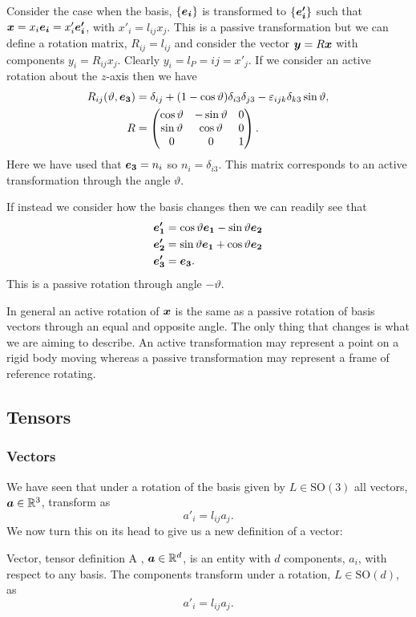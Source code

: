 \documentclass[a4paper]{article}
\newcommand{\specialOrthogonalGroup}{\mathrm{SO}}
\begin{document}
    Consider the case when the basis, \(\{\bm{e_{i}}\}\) is transformed to \(\{\bm{e'_i}\}\) such that \(\bm{x} = x_i\bm{e_{i}} = x'_i\bm{e'_i}\), with \(x'_i = l_{ij}x_j\).
    This is a passive transformation but we can define a rotation matrix, \(R_{ij} = l_{ij}\) and consider the vector \(\bm{y} = R\bm{x}\) with components \(y_i = R_{ij}x_j\).
    Clearly \(y_i = l_P={ij} = x'_j\).
    If we consider an active rotation about the \(z\)-axis then we have
    \begin{align*}
        R_{ij}(\vartheta, \bm{e_{3}}) &= \delta_{ij} + (1 - \cos\vartheta)\delta_{i3}\delta_{j3} - \varepsilon_{ijk}\delta_{k3}\sin\vartheta,\\
        R &= 
        \begin{pmatrix}
            \cos\vartheta & -\sin\vartheta & 0\\
            \sin\vartheta & \cos\vartheta & 0\\
            0 & 0 & 1
        \end{pmatrix}
        .
    \end{align*}
    Here we have used that \(\bm{e_{3}} = n_i\) so \(n_i = \delta_{i3}\).
    This matrix corresponds to an active transformation through the angle \(\vartheta\).
    
    If instead we consider how the basis changes then we can readily see that
    \begin{align*}
        \bm{e'_1} &= \cos\vartheta\bm{e_{1}} - \sin\vartheta\bm{e_{2}}\\
        \bm{e'_2} &= \sin\vartheta\bm{e_{1}} + \cos\vartheta\bm{e_{2}}\\
        \bm{e'_3} &= \bm{e_{3}}.
    \end{align*}
    This is a passive rotation through angle \(-\vartheta\).
    
    In general an active rotation of \(\bm{x}\) is the same as a passive rotation of basis vectors through an equal and opposite angle.
    The only thing that changes is what we are aiming to describe.
    An active transformation may represent a point on a rigid body moving whereas a passive transformation may represent a frame of reference rotating.
    
    \subsection{Tensors}
    \subsubsection{Vectors}
    We have seen that under a rotation of the basis given by \(L\in\specialOrthogonalGroup(3)\) all vectors, \(\bm{a}\in\mathbb{R}^3\), transform as
    \[a'_i = l_{ij}a_j.\]
    We now turn this on its head to give us a new definition of a vector:
    \begin{definition}{Vector, tensor definition}{}
        A , \(\bm{a}\in\mathbb{R}^d\), is an entity with \(d\) components, \(a_i\), with respect to any basis.
        The components transform under a rotation, \(L\in\specialOrthogonalGroup(d)\), as
        \[a'_i = l_{ij}a_j.\]
    \end{definition}
    
\end{document}

